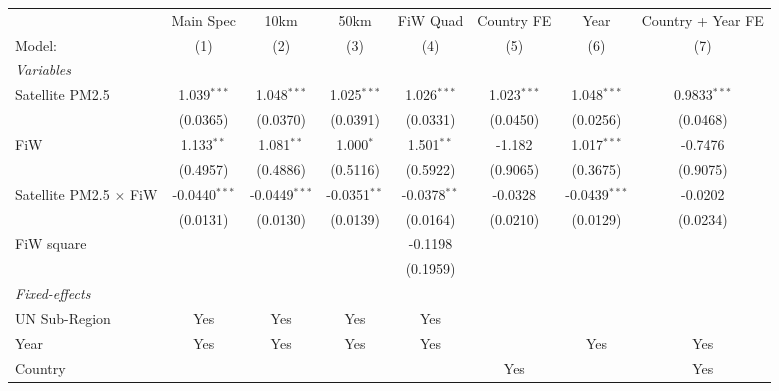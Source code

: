 
\begingroup
\centering
\begin{tabular}{lccccccc}
   \tabularnewline \midrule \midrule
                                 & Main Spec       & 10km            & 50km           & FiW Quad       & Country FE    & Year            & Country + Year FE \\   
   Model:                        & (1)             & (2)             & (3)            & (4)            & (5)           & (6)             & (7)\\  
   \midrule
   \emph{Variables}\\
   Satellite PM2.5               & 1.039$^{***}$   & 1.048$^{***}$   & 1.025$^{***}$  & 1.026$^{***}$  & 1.023$^{***}$ & 1.048$^{***}$   & 0.9833$^{***}$\\   
                                 & (0.0365)        & (0.0370)        & (0.0391)       & (0.0331)       & (0.0450)      & (0.0256)        & (0.0468)\\   
   FiW                           & 1.133$^{**}$    & 1.081$^{**}$    & 1.000$^{*}$    & 1.501$^{**}$   & -1.182        & 1.017$^{***}$   & -0.7476\\   
                                 & (0.4957)        & (0.4886)        & (0.5116)       & (0.5922)       & (0.9065)      & (0.3675)        & (0.9075)\\   
   Satellite PM2.5 $\times$ FiW  & -0.0440$^{***}$ & -0.0449$^{***}$ & -0.0351$^{**}$ & -0.0378$^{**}$ & -0.0328       & -0.0439$^{***}$ & -0.0202\\   
                                 & (0.0131)        & (0.0130)        & (0.0139)       & (0.0164)       & (0.0210)      & (0.0129)        & (0.0234)\\   
   FiW square                    &                 &                 &                & -0.1198        &               &                 &   \\   
                                 &                 &                 &                & (0.1959)       &               &                 &   \\   
   \midrule
   \emph{Fixed-effects}\\
   UN Sub-Region                 & Yes             & Yes             & Yes            & Yes            &               &                 & \\  
   Year                          & Yes             & Yes             & Yes            & Yes            &               & Yes             & Yes\\  
   Country                       &                 &                 &                &                & Yes           &                 & Yes\\  

\end{tabular}
